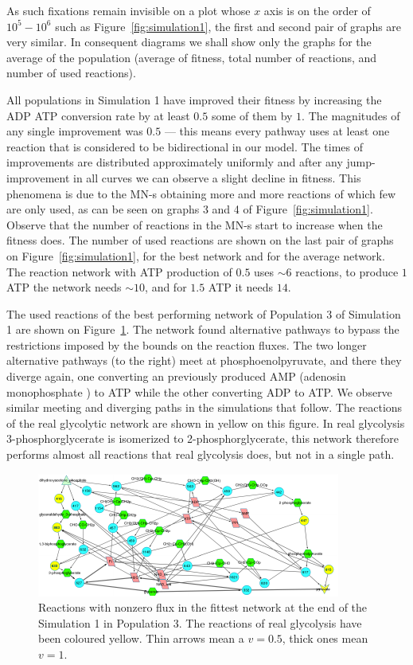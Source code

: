 \documentclass[a4paper,12pt]{article}
\begin{document}
As such fixations remain invisible on a plot whose $x$ axis is on the order of $10^5-10^6$ such as Figure~\ref{fig:simulation1}, the first and second pair of graphs are very similar. In consequent diagrams we shall show only the graphs for the average of the population (average of fitness, total number of reactions, and number of used reactions).

All populations in Simulation 1 have improved their fitness by increasing the ADP ATP conversion rate by at least $0.5$ some of them by $1$. The magnitudes of any single improvement was $0.5$ --- this means every pathway uses at least one reaction that is considered to be bidirectional in our model. The times of improvements are distributed approximately uniformly and after any jump-improvement in all curves we can observe a slight decline in fitness. This phenomena is due to the MN-s obtaining more and more reactions of which few are only used, as can be seen on graphs 3 and 4 of Figure~\ref{fig:simulation1}. Observe that the number of reactions in the MN-s start to increase when the fitness does. The number of used reactions are shown on the last pair of graphs on Figure~\ref{fig:simulation1}, for the best network and for the average network. The reaction network with ATP production of $0.5$ uses $\sim 6$ reactions, to produce $1$ ATP the network needs $\sim 10$, and for $1.5$ ATP it needs $14$. 

The used reactions of the best performing network of Population 3 of Simulation 1 are shown on Figure~\ref{fig:trunk_glyc_final_job1}. The network found alternative pathways to bypass the restrictions imposed by the bounds on the reaction fluxes. The two longer alternative pathways (to the right) meet at phosphoenolpyruvate, and there they diverge again, one converting an previously produced AMP (adenosin monophosphate ) to ATP while the other converting ADP to ATP. We observe similar meeting and diverging paths in the simulations that follow. The reactions of the real glycolytic network are shown in yellow on this figure. In real glycolysis 3-phosphorglycerate is isomerized to 2-phosphorglycerate, this network therefore performs almost all reactions that real glycolysis does, but not in a single path. 



\begin{figure}[htpb]
	\centering
	\includegraphics[width=1\linewidth]{trunk_glyc_final_job1_colored.pdf}
	\caption{Reactions with nonzero flux in the fittest network at the end of the Simulation 1 in Population 3. The reactions of real glycolysis have been coloured yellow. Thin arrows mean a $v=0.5$, thick ones mean $v=1$.}
	\label{fig:trunk_glyc_final_job1}
\end{figure}
\end{document}
